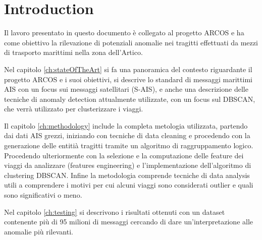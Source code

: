 \chapter*{Introduction}
\label{ch:introduction}

Il lavoro presentato in questo documento è collegato al progetto ARCOS e ha come obiettivo la rilevazione di potenziali anomalie nei tragitti effettuati da mezzi di trasporto marittimi nella zona dell'Artico.

Nel capitolo \ref{ch:stateOfTheArt} si fa una panoramica del contesto riguardante il progetto ARCOS e i suoi obiettivi, si descrive lo standard di messaggi marittimi AIS con un focus sui messaggi satellitari (S-AIS), e anche una descrizione delle tecniche di anomaly detection attualmente utilizzate, con un focus sul DBSCAN, che verrà utilizzato per clusterizzare i viaggi.

Il capitolo \ref{ch:methodology} include la completa metologia utilizzata, partendo dai dati AIS grezzi, iniziando con tecniche di data cleaning e procedendo con la generazione delle entitià tragitti tramite un algoritmo di raggruppamento logico. Procedendo ulteriormente con la selezione e la computazione delle feature dei viaggi da analizzare (features engineering) e l'implementazione dell'algoritmo di clustering DBSCAN. Infine la metodologia comprende tecniche di data analysis utili a comprendere i motivi per cui alcuni viaggi sono considerati outlier e quali sono significativi o meno.

Nel capitolo \ref{ch:testing} si descrivono i risultati ottenuti con un dataset contenente più di 95 milioni di messaggi cercando di dare un'interpretazione alle anomalie più rilevanti.
